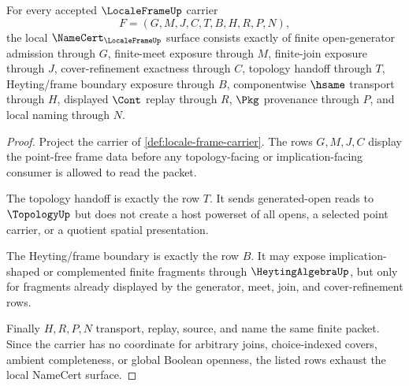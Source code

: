 \begin{theorem}
\label{thm:locale-frame-namecert-obligations}
For every accepted $\LocaleFrameUp$ carrier
$$
F=(G,M,J,C,T,B,H,R,P,N),
$$
the local $\NameCert_{\LocaleFrameUp}$ surface consists exactly of finite open-generator admission through $G$, finite-meet exposure through $M$, finite-join exposure through $J$, cover-refinement exactness through $C$, topology handoff through $T$, Heyting/frame boundary exposure through $B$, componentwise $\hsame$ transport through $H$, displayed $\Cont$ replay through $R$, $\Pkg$ provenance through $P$, and local naming through $N$.
\end{theorem}
\begin{proof}
Project the carrier of \autoref{def:locale-frame-carrier}. The rows $G,M,J,C$ display the point-free frame data before any topology-facing or implication-facing consumer is allowed to read the packet.

The topology handoff is exactly the row $T$. It sends generated-open reads to $\TopologyUp$ but does not create a host powerset of all opens, a selected point carrier, or a quotient spatial presentation.

The Heyting/frame boundary is exactly the row $B$. It may expose implication-shaped or complemented finite fragments through $\HeytingAlgebraUp$, but only for fragments already displayed by the generator, meet, join, and cover-refinement rows.

Finally $H,R,P,N$ transport, replay, source, and name the same finite packet. Since the carrier has no coordinate for arbitrary joins, choice-indexed covers, ambient completeness, or global Boolean openness, the listed rows exhaust the local NameCert surface.
\end{proof}

